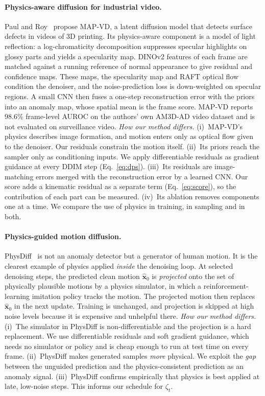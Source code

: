 \documentclass[11pt,a4paper]{article}
\begin{document}
\paragraph{Physics-aware diffusion for industrial video.}
Paul and Roy~\cite{paul2026mapvd} propose MAP-VD, a latent diffusion model that detects surface defects in videos of 3D printing. Its physics-aware component is a model of light reflection: a log-chromaticity decomposition suppresses specular highlights on glossy parts and yields a specularity map. DINOv2 features of each frame are matched against a running reference of normal appearance to give residual and confidence maps. These maps, the specularity map and RAFT optical flow condition the denoiser, and the noise-prediction loss is down-weighted on specular regions. A small CNN then fuses a one-step reconstruction error with the priors into an anomaly map, whose spatial mean is the frame score. MAP-VD reports 98.6\% frame-level AUROC on the authors' own AM3D-AD video dataset and is not evaluated on surveillance video.
\emph{How our method differs.}
(i)~MAP-VD's physics describes image formation, and motion enters only as optical flow given to the denoiser. Our residuals constrain the motion itself.
(ii)~Its priors reach the sampler only as conditioning inputs. We apply differentiable residuals as gradient guidance at every DDIM step (Eq.~\ref{eq:dps}).
(iii)~Its residuals are image-matching errors merged with the reconstruction error by a learned CNN. Our score adds a kinematic residual as a separate term (Eq.~\ref{eq:score}), so the contribution of each part can be measured.
(iv)~Its ablation removes components one at a time. We compare the use of physics in training, in sampling and in both.

\paragraph{Physics-guided motion diffusion.}
PhysDiff~\cite{yuan2023physdiff} is not an anomaly detector but a generator of human motion. It is the clearest example of physics applied \emph{inside} the denoising loop. At selected denoising steps, the predicted clean motion $\hat{\mathbf{x}}_0$ is \emph{projected} onto the set of physically plausible motions by a physics simulator, in which a reinforcement-learning imitation policy tracks the motion. The projected motion then replaces $\hat{\mathbf{x}}_0$ in the next update. Training is unchanged, and projection is skipped at high noise levels because it is expensive and unhelpful there.
\emph{How our method differs.}
(i)~The simulator in PhysDiff is non-differentiable and the projection is a hard replacement. We use differentiable residuals and soft gradient guidance, which needs no simulator or policy and is cheap enough to run at test time on every frame.
(ii)~PhysDiff makes generated samples \emph{more} physical. We exploit the \emph{gap} between the unguided prediction and the physics-consistent prediction as an anomaly signal.
(iii)~PhysDiff confirms empirically that physics is best applied at late, low-noise steps. This informs our schedule for $\zeta_t$.
\end{document}
